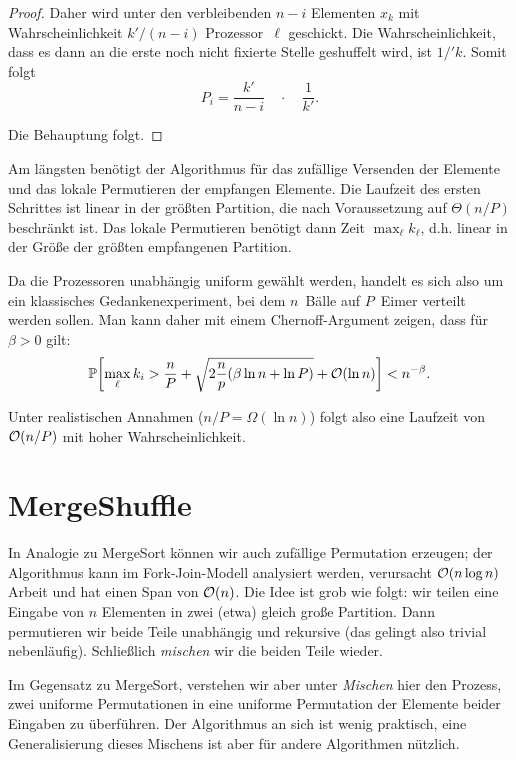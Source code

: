 \begin{proof}
        Daher wird unter den verbleibenden $n-i$ Elementen $x_k$ mit Wahrscheinlichkeit $k' / (n-i)$ Prozessor~$\ell$ geschickt.
        Die Wahrscheinlichkeit, dass es dann an die erste noch nicht fixierte Stelle geshuffelt wird, ist $1 / 'k$.
        Somit folgt
        \begin{equation}
            P_i = \frac{k'}{n - i} \quad \cdot \quad \frac{1}{k'}.
        \end{equation}

        \noindent
        Die Behauptung folgt.
    \end{proof}
\fi

Am längsten benötigt der Algorithmus für das zufällige Versenden der Elemente und das lokale Permutieren der empfangen Elemente.
Die Laufzeit des ersten Schrittes ist linear in der größten Partition, die nach Voraussetzung auf $\Theta(n / P)$ beschränkt ist.
Das lokale Permutieren benötigt dann Zeit $\max_\ell k_\ell$, d.h. linear in der Größe der größten empfangenen Partition.

Da die Prozessoren unabhängig uniform gewählt werden, handelt es sich also um ein klassisches Gedankenexperiment, bei dem $n$~Bälle auf $P$~Eimer verteilt werden sollen.
Man kann daher mit einem Chernoff-Argument zeigen, dass für $\beta > 0$ gilt:
\begin{equation}
    \mathbb{P}\!\left[\max_\ell k_i > \frac{n}{P} + \sqrt{2 \frac n p (\beta \ln n + \ln P)  } + \mathcal{O}\!\left(\ln n\right)\right] <  n^{-\beta}.
\end{equation}

Unter realistischen Annahmen ($n / P = \Omega(\ln n)$) folgt also eine Laufzeit von $\mathcal{O}\!\left(n / P\right)$ mit hoher Wahrscheinlichkeit.

\iffalse
    \section{MergeShuffle}
    In Analogie zu MergeSort können wir auch zufällige Permutation erzeugen;
    der Algorithmus kann im Fork-Join-Modell analysiert werden, verursacht $\mathcal{O}\!\left(n \log n\right)$ Arbeit und hat einen Span von $\mathcal{O}\!\left(n\right)$.
    Die Idee ist grob wie folgt:
    wir teilen eine Eingabe von $n$ Elementen in zwei (etwa) gleich große Partition.
    Dann permutieren wir beide Teile unabhängig und rekursive (das gelingt also trivial nebenläufig).
    Schließlich \emph{mischen} wir die beiden Teile wieder.

    Im Gegensatz zu MergeSort, verstehen wir aber unter \emph{Mischen} hier den Prozess,
    zwei uniforme Permutationen in eine uniforme Permutation der Elemente beider Eingaben zu überführen.
    Der Algorithmus an sich ist wenig praktisch, eine Generalisierung dieses Mischens ist aber für andere Algorithmen nützlich.

